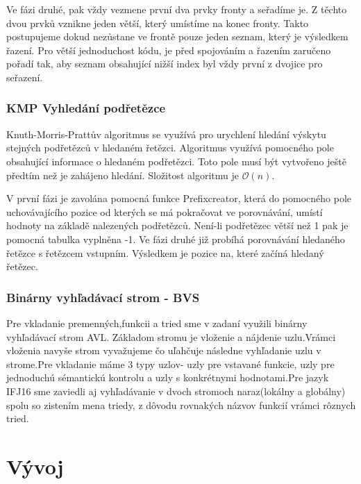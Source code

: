 \documentclass[12pt,a4paper]{report}
\begin{document}
\par Ve fázi druhé, pak vždy vezmene první dva prvky fronty a seřadíme je. Z těchto dvou prvků vznikne jeden větší, který umístíme na konec fronty. Takto postupujeme dokud nezůstane ve frontě pouze jeden seznam, který je výsledkem řazení. Pro větší jednoduchost kódu, je před spojováním a řazením zaručeno pořadí tak, aby seznam obsahující nižší index byl vždy první z dvojice pro seřazení.

\subsection{KMP Vyhledání podřetězce}
\par Knuth-Morris-Prattův algoritmus se využívá pro urychlení hledání výskytu stejných podřetězců v hledaném řetězci. Algoritmus využívá pomocného pole obsahující informace o hledaném podřetězci. Toto pole musí být vytvořeno ještě předtím než je zahájeno hledání. Složitost algoritmu je $\mathcal{O}(n)$.
\par V první fázi je zavolána pomocná funkce Prefixcreator, která do pomocného pole uchovávajícího pozice od kterých se má pokračovat ve porovnávání, umístí hodnoty na základě nalezených podřetězců. Není-li podřetězec větší než 1 pak je pomocná tabulka vyplněna -1.
Ve fázi druhé již probíhá porovnávání hledaného řetězce s řetězcem vstupním. Výsledkem je pozice na, které začíná hledaný řetězec.


\subsection{Binárny vyhľadávací strom - BVS}
\par Pre vkladanie premenných,funkcii a tried sme v zadaní využili binárny vyhľadávací strom AVL. Základom stromu je vloženie a nájdenie uzlu.Vrámci vloženia navyše strom vyvažujeme čo uľahčuje následne vyhľadanie uzlu v strome.Pre vkladanie máme 3 typy uzlov- uzly pre vstavané funkcie, uzly pre jednoduchú sémantickú kontrolu a uzly s konkrétnymi hodnotami.Pre jazyk IFJ16 sme zaviedli aj vyhľadávanie v dvoch stromoch naraz(lokálny a globálny) spolu so zistením mena triedy, z dôvodu rovnakých názvov funkcií vrámci rôznych tried.

\chapter{Vývoj}
\end{document}

